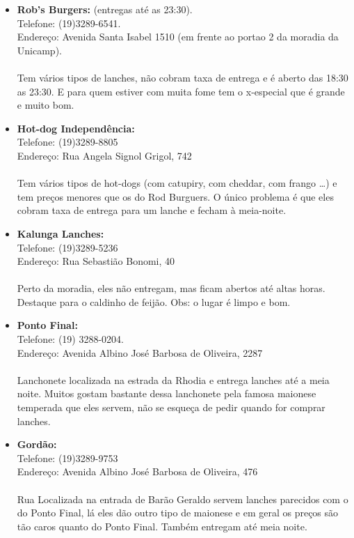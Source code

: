 \begin{itemize}
\item   \textbf{Rob's Burgers:} (entregas até as 23:30).
        \\Telefone: (19)3289-6541.
        \\Endereço: Avenida Santa Isabel 1510 (em frente ao portao 2 da moradia da Unicamp).
        \\\\Tem vários tipos de lanches, não cobram taxa de entrega e é aberto
        das 18:30 as 23:30. E para quem estiver com muita fome tem o x-especial
        que é grande e muito bom.

\item   \textbf{Hot-dog Independência:}
        \\Telefone: (19)3289-8805
        \\Endereço: Rua Angela Signol Grigol, 742
        \\\\Tem vários tipos de hot-dogs (com catupiry, com cheddar, com frango
        {\dots}) e tem preços menores que os do Rod Burguers. O único problema é
        que eles cobram taxa de entrega para um lanche e fecham à meia-noite.

\item   \textbf{Kalunga Lanches:}
        \\Telefone: (19)3289-5236
        \\Endereço: Rua Sebastião Bonomi, 40
        \\\\Perto da moradia, eles não entregam, mas ficam abertos até altas
        horas. Destaque para o caldinho de feijão. Obs: o lugar é limpo e bom.

\item   \textbf{Ponto Final:}
        \\Telefone: (19) 3288-0204.
        \\Endereço: Avenida Albino José Barbosa de Oliveira, 2287
        \\\\Lanchonete localizada na estrada da Rhodia e entrega lanches até a
        meia noite. Muitos gostam bastante dessa lanchonete pela famosa maionese
        temperada que eles servem, não se esqueça de pedir quando for comprar
        lanches.

\item   \textbf{Gordão:}
        \\Telefone: (19)3289-9753
        \\Endereço: Avenida Albino José Barbosa de Oliveira, 476
        \\\\Rua Localizada na entrada de Barão Geraldo servem lanches parecidos
        com o do Ponto Final, lá eles dão outro tipo de maionese e em geral os
        preços são tão caros quanto do Ponto Final. Também entregam até meia
        noite.


\end{itemize}
